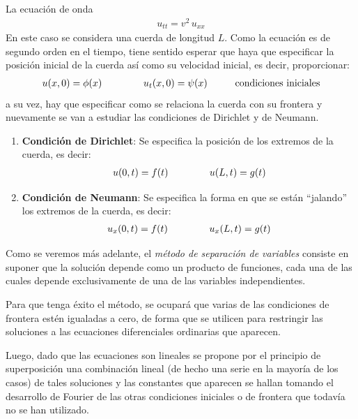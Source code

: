 La ecuación de onda
\begin{align*}
u_{tt} = v^{2} \, u_{xx}
\end{align*}
En este caso se considera una cuerda de longitud $L$. Como la ecuación es de segundo orden en el tiempo, tiene sentido esperar que haya que especificar la posición inicial de la cuerda así como su velocidad inicial, es decir, proporcionar:
\begin{align}
u (x, 0) = \phi (x) \hspace{1.5cm} u_{t} (x, 0) = \psi (x) \hspace{1cm} \mbox{condiciones iniciales}
\label{eq:ecuacion_06_02_07}
\end{align}
a su vez, hay que especificar como se relaciona la cuerda con su frontera y nuevamente se van a estudiar las condiciones de Dirichlet y de Neumann.
\begin{enumerate}
\item \textbf{Condición de Dirichlet}: Se especifica la posición de los extremos de la cuerda, es decir:
\begin{align}
u (0, t) = f (t) \hspace{1.5cm} u (L, t) = g (t)
\label{eq:ecuacion_06_02_08}   
\end{align}
\item \textbf{Condición de Neumann}: Se especifica la forma en que se están \enquote{jalando} los extremos de la cuerda, es decir:
\begin{align}
u_{x} (0, t) = f (t) \hspace{1.5cm} u_{x} (L, t) = g (t)
\label{eq:ecuacion_06_02_09}    
\end{align}
\end{enumerate}
Como se veremos más adelante, el \emph{método de separación de variables} consiste en suponer que la solución depende como un producto de funciones, cada una de las cuales depende exclusivamente de una de las variables independientes.
\par
Para que tenga éxito el método, se ocupará que varias de las condiciones de frontera estén igualadas a cero, de forma que se utilicen para restringir las soluciones a las ecuaciones diferenciales ordinarias que aparecen.
\par
Luego, dado que las ecuaciones son lineales se propone por el principio de superposición una combinación lineal (de hecho una serie en la mayoría de los casos) de tales soluciones y las constantes que aparecen se hallan tomando el desarrollo de Fourier de las otras condiciones iniciales o de frontera que todavía no se han utilizado.

